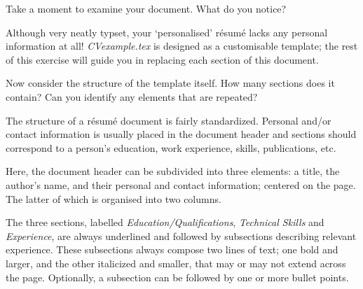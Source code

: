 
Take a moment to examine your document. What do you notice? 

Although very neatly typset, your `personalised' r\'esum\'e lacks any personal information at all! \emph{CVexample.tex} is designed as a customisable template; the rest of this exercise will guide you in replacing each section of this document. \par

Now consider the structure of the template itself. How many sections does it contain? Can you identify any elements that are repeated? \par

The structure of a r\'esum\'e document is fairly standardized. Personal and/or contact information is usually placed in the document header and sections should correspond to a person's education, work experience, skills, publications, etc. \par

Here, the document header can be subdivided into three elements: a title, the author's name, and their personal and contact information; centered on the page. The latter of which is organised into two columns. \par 

The three sections, labelled \emph{Education/Qualifications}, \emph{Technical Skills} and \emph{Experience}, are always underlined and followed by subsections describing relevant experience. These subsections always compose two lines of text; one bold and larger, and the other italicized and smaller, that may or may not extend across the page. Optionally, a subsection can be followed by one or more bullet points. \par